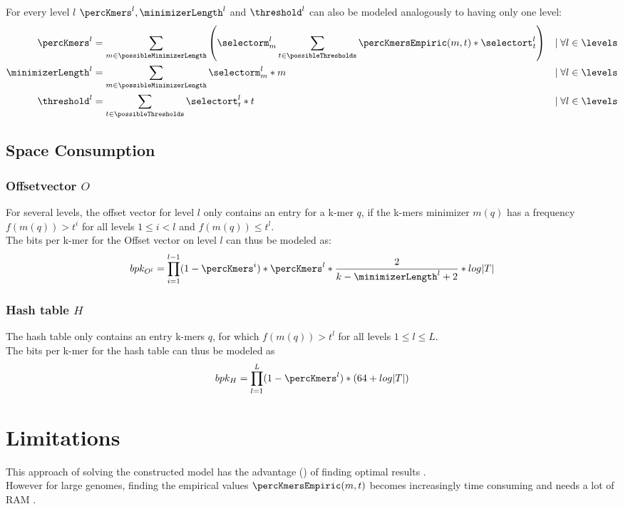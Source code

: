 For every level $l$ $\percKmers^l, \minimizerLength^l$ and $\threshold^l$ can also be modeled analogously to having only one level: 
\begin{align*}
	\percKmers^l &= \sum_{m \in \possibleMinimizerLength} \left( \selectorm_m^l \sum_{t \in \possibleThresholds} \percKmersEmpiric(m, t) * \selectort_t^l\right) & \mid \forall l \in \levels\\
	\minimizerLength^l &= \sum_{m \in \possibleMinimizerLength} \selectorm_m^l * m  & \mid \forall l \in \levels\\
	\threshold^l &= \sum_{t \in \possibleThresholds} \selectort_t^l * t & \mid \forall l \in \levels
\end{align*}


\subsection*{Space Consumption}
\subsubsection*{Offsetvector $O$}
For several levels, the offset vector for level $l$ only contains an entry for a k-mer $q$, if the k-mers minimizer $m(q)$ has a frequency $f(m(q)) > t^{i}$ for all levels $1 \leq i < l$ and $f(m(q)) \leq t^{l}$. \\
The bits per k-mer for the Offset vector on level $l$ can thus be modeled as:
\[bpk_{O^l} = \prod_{i=1}^{l-1} (1-\percKmers^i) * \percKmers^l * \frac{2}{k-\minimizerLength^l+2} * log |T| \]

\subsubsection*{Hash table $H$}
The hash table only contains an entry k-mers $q$, for which $f(m(q)) > t^l$ for all levels $1 \leq l \leq L$.\\
The bits per k-mer for the hash table can thus be modeled as 
\[ bpk_H = \prod_{l=1}^{L} (1-\percKmers^l) * (64 + log|T|)\]

\section*{Limitations}
This approach of solving the constructed model has the advantage () of finding optimal results .\\
However for large genomes, finding the empirical values $\percKmersEmpiric(m,t)$ becomes increasingly time consuming and needs a lot of RAM .\\


